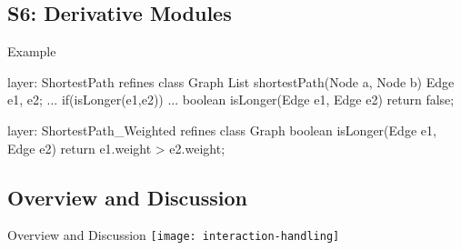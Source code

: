 \subsection{S6: Derivative Modules}

\begin{frame}{\myframetitle}
\end{frame}

\begin{frame}[fragile]{Example}
	\begin{mycolumns}[widths={50,50},animation=none]
\begin{codetight}{layer: ShortestPath}
refines class Graph {
	List shortestPath(Node a, Node b){
		Edge e1, e2;
		...
		if(isLonger(e1,e2)) 
		... 
	}
	boolean isLonger(Edge e1, Edge e2){
		return false;
	}
}
\end{codetight}	
	\mynextcolumn
\begin{codetight}{layer: ShortestPath\_Weighted}
refines class Graph {
	boolean isLonger(Edge e1, Edge e2){
		return e1.weight > e2.weight;
	}
}
\end{codetight}	
	\end{mycolumns}
\end{frame}

\subsection{Overview and Discussion}

\begin{frame}{Overview and Discussion}
	\centering\texttt{[image: interaction-handling]}
\end{frame}


